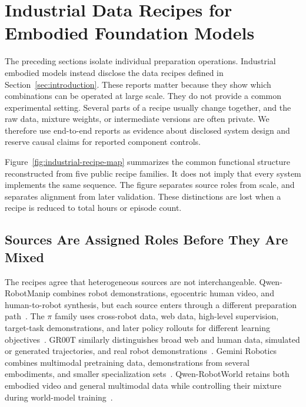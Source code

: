 \section{Industrial Data Recipes for Embodied Foundation Models}
\label{sec:industrial-recipes}

The preceding sections isolate individual preparation operations. Industrial embodied models instead disclose the data recipes defined in Section~\ref{sec:introduction}. These reports matter because they show which combinations can be operated at large scale. They do not provide a common experimental setting. Several parts of a recipe usually change together, and the raw data, mixture weights, or intermediate versions are often private. We therefore use end-to-end reports as evidence about disclosed system design and reserve causal claims for reported component controls.

Figure~\ref{fig:industrial-recipe-map} summarizes the common functional structure reconstructed from five public recipe families. It does not imply that every system implements the same sequence. The figure separates source roles from scale, and separates alignment from later validation. These distinctions are lost when a recipe is reduced to total hours or episode count.



\subsection{Sources Are Assigned Roles Before They Are Mixed}

The recipes agree that heterogeneous sources are not interchangeable. Qwen-RobotManip combines robot demonstrations, egocentric human video, and human-to-robot synthesis, but each source enters through a different preparation path~\cite{yuan2026qwen_2606_17846}. The $\pi$ family uses cross-robot data, web data, high-level supervision, target-task demonstrations, and later policy rollouts for different learning objectives~\cite{intelligence20250_2504_16054,intelligence20260_2604_15483}. GR00T similarly distinguishes broad web and human data, simulated or generated trajectories, and real robot demonstrations~\cite{nvidia2025gr00t_2503_14734}. Gemini Robotics combines multimodal pretraining data, demonstrations from several embodiments, and smaller specialization sets~\cite{team2025gemini_2503_20020,team2025gemini_2510_03342}. Qwen-RobotWorld retains both embodied video and general multimodal data while controlling their mixture during world-model training~\cite{zhang2026qwen_2606_17030}.

